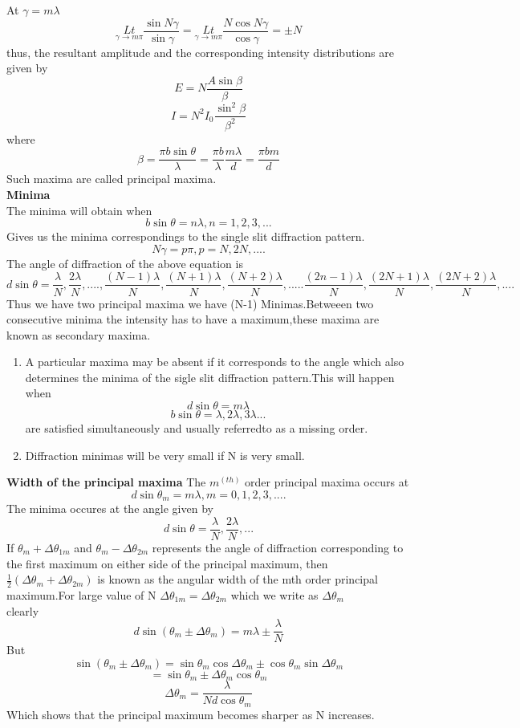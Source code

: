 At $\gamma=m\lambda$ \\
$$\underset{\gamma \rightarrow m \pi}{L t} \frac{\sin N \gamma}{\sin \gamma}=\underset{\gamma \rightarrow m \pi}{L t} \frac{N \cos N \gamma}{\cos \gamma}=\pm N$$
thus, the resultant amplitude and the corresponding intensity distributions are given by
$$
E=N \frac{A \sin \beta}{\beta}
$$
$$
I=N^{2} I_{0} \frac{\sin ^{2} \beta}{\beta^{2}}
$$
where
$$
\beta=\frac{\pi b \sin \theta}{\lambda}=\frac{\pi b}{\lambda} \frac{m \lambda}{d}=\frac{\pi b m}{d}
$$
Such maxima are called principal maxima.\\
\textbf{Minima}\\
The minima will obtain when \\
$$b\sin\theta=n\lambda,n=1,2,3,...$$
Gives us the minima correspondings to the single slit diffraction pattern.
$$N\gamma=p\pi,p=N,2N,....$$ The angle of diffraction of the above equation is \\
$$d\sin \theta=\frac{\lambda}{N},\frac{2\lambda}{N},....,\frac{(N-1)\lambda}{N},\frac{(N+1)\lambda}{N},\frac{(N+2)\lambda}{N},.....\frac{(2n-1)\lambda}{N},\frac{(2N+1)\lambda}{N},\frac{(2N+2)\lambda}{N},....$$
Thus we have two principal maxima we have (N-1) Minimas.Betweeen two consecutive minima the intensity has to have a maximum,these maxima are known as secondary maxima.\\
\begin{note}
	\begin{enumerate}
	\item A particular maxima may be absent if it corresponds to the angle which also determines the minima of the sigle slit diffraction pattern.This will happen when 
	$$d\sin \theta =m\lambda$$
	$$b\sin\theta=\lambda,2\lambda,3\lambda...$$
	are satisfied simultaneously and usually referredto as a missing order.\\
	\item Diffraction minimas will be very small if N is very small.
		\end{enumerate}
\end{note}
\textbf{Width of the principal maxima}
The $m^{(th)}$ order principal maxima occurs at \\
$$d\sin \theta_{m}=m\lambda,m=0,1,2,3,....$$
The minima occures at the angle given by 
$$d\sin\theta=\frac{\lambda}{N},\frac{2\lambda}{N},...$$
If $\theta_m+\Delta \theta_{1m}$ and $\theta_m-\Delta \theta_{2m}$ represents the angle of diffraction corresponding to the first maximum on either side of the principal maximum, then $\frac{1}{2}(\Delta \theta_m+\Delta \theta_{2m})$ is known as the angular width of the mth order principal maximum.For large value of N $\Delta\theta_{1m}=\Delta\theta_{2m}$ which we write as $\Delta \theta_m$\\
clearly $$d\sin(\theta_m\pm\Delta\theta_m)=m\lambda\pm\frac{\lambda}{N}$$
But\\
$$\sin(\theta_m\pm\Delta \theta_m)=\sin\theta_m \cos \Delta\theta_{m}\pm\cos \theta_m\sin\Delta \theta_m$$
$$=\sin\theta_{m}\pm\Delta \theta_{m}\cos\theta_{m}$$
$$\Delta\theta_{m}=\frac{\lambda}{Nd\cos \theta_m}$$
Which shows that the principal maximum becomes sharper as N increases.

